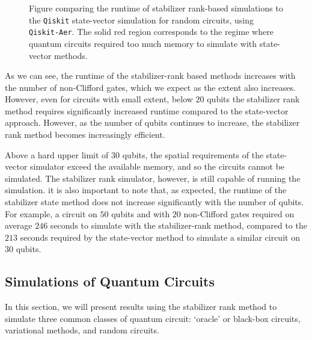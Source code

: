 \begin{figure}[t]
\centering
\begin{scaletikzpicturetowidth}{0.75\textwidth}
    
\end{scaletikzpicturetowidth}
\caption{Figure comparing the runtime of stabilizer rank-based simulations to the \texttt{Qiskit} state-vector simulation for random circuits, using \texttt{Qiskit-Aer}. The solid red region corresponds to the regime where quantum circuits required too much memory to simulate with state-vector methods.}\label{fig:qiskit_race}
\end{figure}
As we can see, the runtime of the stabilizer-rank based methods increases with the number of non-Clifford gates, which we expect as the extent also increases. However, even for circuits with small extent, below $20$ qubits the stabilizer rank method requires significantly increased runtime compared to the state-vector approach. However, as the number of qubits continues to increase, the stabilizer rank method becomes increasingly efficient.\par
Above a hard upper limit of $30$ qubits, the spatial requirements of the state-vector simulator exceed the available memory, and so the circuits cannot be simulated. The stabilizer rank simulator, however, is still capable of running the simulation. it is also important to note that, as expected, the runtime of the stabilizer state method does not increase significantly with the number of qubits. For example, a circuit on $50$ qubits and with $20$ non-Clifford gates required on average $246$ seconds to simulate with the stabilizer-rank method, compared to the $213$ seconds required by the state-vector method to simulate a similar circuit on $30$ qubits.
\subsection{Simulations of Quantum Circuits}\label{sec:circuit_simulations}
In this section, we will present results using the stabilizer rank method to simulate three common classes of quantum circuit: `oracle' or black-box circuits, variational methods, and random circuits.

